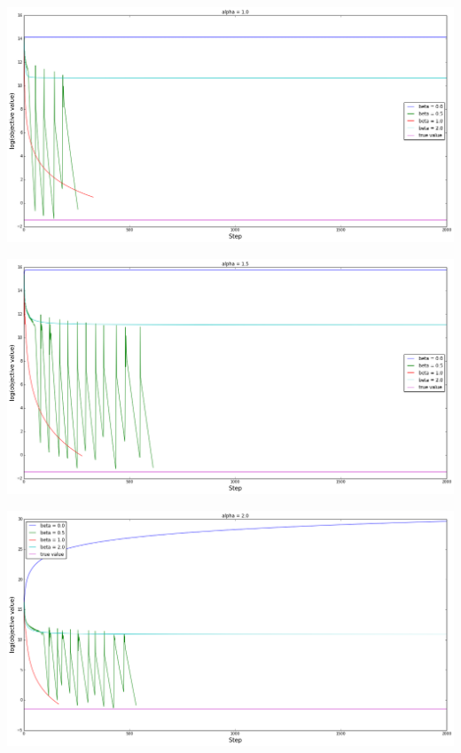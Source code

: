 \documentclass[12pt, a4paper]{article}
\begin{document}
			\begin{center}
				\includegraphics[width=16cm]{4par_10.png}
			\end{center}

			\begin{center}
				\includegraphics[width=16cm]{4par_15.png}
			\end{center}

			\begin{center}
				\includegraphics[width=16cm]{4par_20.png}
			\end{center}
\end{document}
